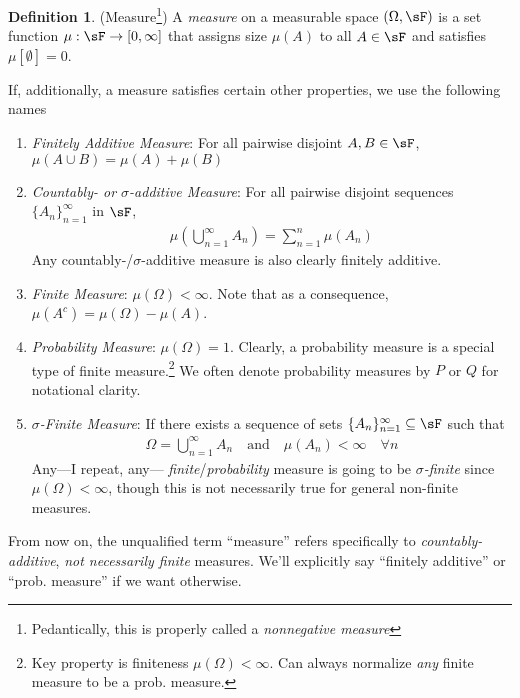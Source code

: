 \documentclass[12pt]{article}
\theoremstyle{plain}
\theoremstyle{definition}
\newtheorem{defn}[thm]{Definition}
\theoremstyle{remark}
\newcommand{\ninf}{_{n=1}^\infty}
\begin{document}
\begin{defn}(Measure\footnote{%
  Pedantically, this is properly called a \emph{nonnegative measure}
})
\label{defn:measure}
A \emph{measure}
on a measurable space $(\Omega,\sF)$ is a set function
$\mu: \sF \rightarrow [0,\infty]$
that assigns size $\mu(A)$ to all $A\in\sF$ and satisfies
$\mu[\emptyset]=0$.

If, additionally, a measure satisfies certain other properties, we use
the following names
\begin{enumerate}
  \item \emph{Finitely Additive Measure}:
    For all pairwise disjoint $A,B\in\sF$,
    $\mu(A\cup B)=\mu(A) + \mu(B)$
  \item \emph{Countably- or $\sigma$-additive Measure}:
    For all pairwise disjoint sequences $\{A_n\}_{n=1}^\infty$ in $\sF$,
    \begin{align*}
      \mu\left(\bigcup^\infty_{n=1}A_n\right)
      = \sum^n_{n=1} \mu(A_n)
    \end{align*}
    Any countably-/$\sigma$-additive measure is also clearly
    finitely additive.

  \item \emph{Finite Measure}:
    $\mu(\Omega)<\infty$. Note that as a consequence,
    $\mu(A^c) = \mu(\Omega) - \mu(A)$.

  \item \emph{Probability Measure}:
    $\mu(\Omega)=1$. Clearly, a probability measure is a special type
    of finite measure.\footnote{%
      Key property is finiteness $\mu(\Omega)<\infty$.
      Can always normalize \emph{any} finite measure to be a prob.
      measure.
    }
    We often denote probability measures by $P$ or
    $Q$ for notational clarity.


  \item \emph{$\sigma$-Finite Measure}:
    If there exists a sequence of sets $\{A_n\}\ninf\subseteq \sF$ such
    that
    \begin{align*}
      \Omega = \bigcup\ninf A_n
      \quad \text{and}\quad
      \mu(A_n)<\infty
      \quad\forall n
    \end{align*}
    Any---I repeat, any--- \emph{finite}/\emph{probability} measure is
    going to be \emph{$\sigma$-finite} since $\mu(\Omega)<\infty$,
    though this is not necessarily true for general non-finite measures.
\end{enumerate}
From now on, the unqualified term ``measure'' refers specifically
to \emph{countably-additive}, \emph{not necessarily finite} measures.
We'll explicitly say ``finitely additive'' or
``prob. measure'' if we want otherwise.


\end{defn}
\end{document}

